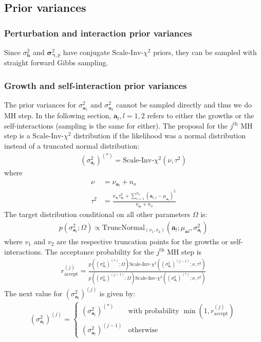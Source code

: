 \documentclass{article}
\newcommand{\ScaledInvChiSquareddist}{\text{Scale-Inv-}\chi^2}
\newcommand{\TruncNormaldist}[2]{\text{TruncNormal}_{(#1, #2)}}
\newcommand{\growth}{\mathbf{a}_1}
\newcommand{\vargrowth}{\sigma^2_{\growth}}
\newcommand{\si}{\mathbf{a}_2}
\newcommand{\varsi}{\sigma^2_{\si}}
\newcommand{\interact}{\mathbf{b}}
\newcommand{\varinteract}{\sigma^2_{\interact}}
\newcommand{\pert}{\mathbf{\gamma}}
\newcommand{\varperti}[1]{\mathbf{\sigma}^2_{\pert, #1}}
\newcommand{\al}[1]{\mathbf{a}_{#1}} %
\newcommand{\dof}{\nu} %
\newcommand{\scale}{\tau^2} %
\begin{document}
\subsection{Prior variances}

\subsubsection{Perturbation and interaction prior variances}
Since $\varinteract$ and $\varperti{p}$ have conjugate $\ScaledInvChiSquareddist$ priors, they can be sampled with straight forward Gibbs sampling.

\subsubsection{Growth and self-interaction prior variances}
The prior variances for $\vargrowth$ and $\varsi$ cannot be sampled directly and thus we do MH step. In the following section, $\al{l}, l=1,2$ refers to either the growths or the self-interactions (sampling is the same for either). The proposal for the $j^{\text{th}}$ MH step is a $\ScaledInvChiSquareddist$ distribution if the likelihood was a normal distribution instead of a truncated normal distribution:
\begin{align}
    (\sigma^{2}_{\al{l}})^{(*)} = \ScaledInvChiSquareddist ( \dof , \scale )
\end{align}
where
\begin{align}
    \dof & = \dof_{\al{l}} + n_o \\
    \scale & = \frac
        {\dof_{\al{l}} \scale_{\al{l}} + 
            \sum_{i=1}^{n_o}(\al{l,i} - \mu_{\al{l}})^2}
        {\dof_{\al{l}} + n_o}
\end{align}
The target distribution conditional on all other parameters $\Omega$ is:
\begin{align}
    p(\sigma_{\al{l}}^2 ; \Omega) \propto 
        \TruncNormaldist{v_1}{v_2}
        (\al{l}; \mu_{\al{}l}, \sigma_{\al{l}}^2)
\end{align}
where $v_1$ and $v_2$ are the respective truncation points for the growths or self-interactions. The acceptance probability for the $j^{\text{th}}$ MH step is
\begin{align}
    r_{\text{accept}}^{(j)} = \frac
        {
            p((\sigma^{2}_{\al{l}})^{(*)}; \Omega)
            \ScaledInvChiSquareddist((\sigma^{2}_{\al{l}})^{(j-1)} ; \dof, \scale)
        }
        {
            p((\sigma^{2}_{\al{l}})^{(j-1)}; \Omega)
            \ScaledInvChiSquareddist((\sigma^{2}_{\al{l}})^{(*)} ; \dof, \scale)
        }
\end{align}
The next value for $(\sigma^2_{\al{l}})^{(j)}$ is given by:
\begin{align}
    (\sigma^2_{\al{l}})^{(j)} = \begin{cases}
        (\sigma^2_{\al{l}})^{(*)} & \text{with probability } \min (1, r_{\text{accept}}^{(j)}) \\
        (\sigma^2_{\al{l}})^{(j-1)} & \text{otherwise}
    \end{cases}
\end{align}
\end{document}
